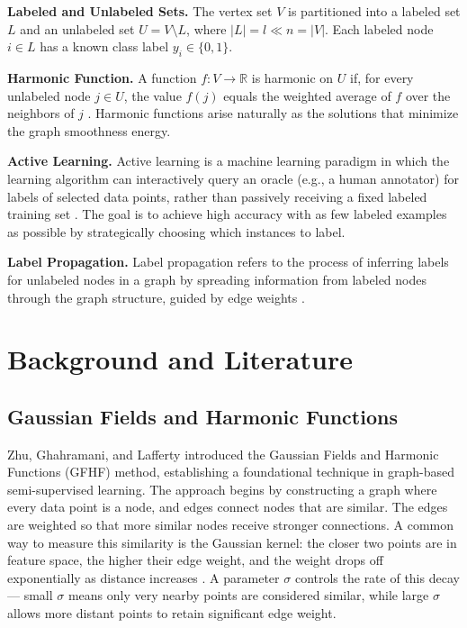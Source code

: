 \documentclass[12pt]{article}
\begin{document}
\textbf{Labeled and Unlabeled Sets.} The vertex set $V$ is partitioned into a labeled set $L$ and an unlabeled set $U = V \setminus L$, where $|L| = l \ll n = |V|$. Each labeled node $i \in L$ has a known class label $y_i \in \{0, 1\}$.

\textbf{Harmonic Function.} A function $f: V \rightarrow \mathbb{R}$ is harmonic on $U$ if, for every unlabeled node $j \in U$, the value $f(j)$ equals the weighted average of $f$ over the neighbors of $j$ \cite{Zhu2003}. Harmonic functions arise naturally as the solutions that minimize the graph smoothness energy.

\textbf{Active Learning.} Active learning is a machine learning paradigm in which the learning algorithm can interactively query an oracle (e.g., a human annotator) for labels of selected data points, rather than passively receiving a fixed labeled training set \cite{Settles2012}. The goal is to achieve high accuracy with as few labeled examples as possible by strategically choosing which instances to label.

\textbf{Label Propagation.} Label propagation refers to the process of inferring labels for unlabeled nodes in a graph by spreading information from labeled nodes through the graph structure, guided by edge weights \cite{Zhu2005}.


\section{Background and Literature}

\subsection{Gaussian Fields and Harmonic Functions}

Zhu, Ghahramani, and Lafferty \cite{Zhu2003} introduced the Gaussian Fields and Harmonic Functions (GFHF) method, establishing a foundational technique in graph-based semi-supervised learning. The approach begins by constructing a graph where every data point is a node, and edges connect nodes that are similar. The edges are weighted so that more similar nodes receive stronger connections. A common way to measure this similarity is the Gaussian kernel: the closer two points are in feature space, the higher their edge weight, and the weight drops off exponentially as distance increases \cite{Zhu2003}. A parameter $\sigma$ controls the rate of this decay --- small $\sigma$ means only very nearby points are considered similar, while large $\sigma$ allows more distant points to retain significant edge weight.
\end{document}
